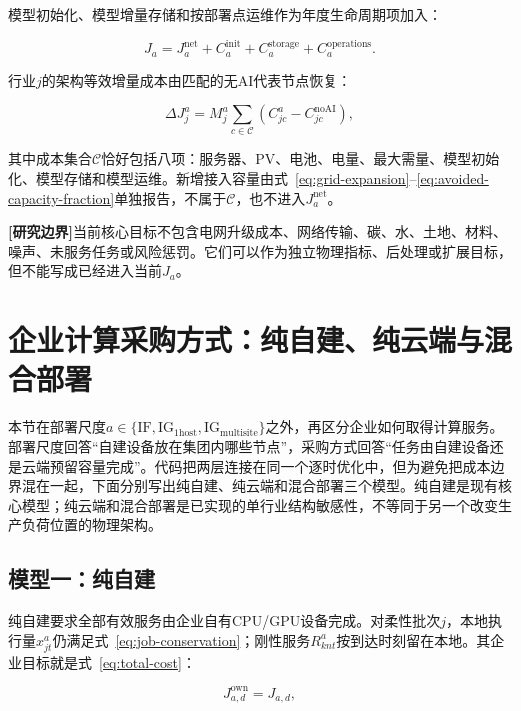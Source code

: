\documentclass[preprint]{elsarticle}
\newcommand{\boundary}{\textcolor{black!65}{\textbf{[研究边界]}}}
\begin{document}
模型初始化、模型增量存储和按部署点运维作为年度生命周期项加入：

\begin{equation}
 J_a=J_a^{\mathrm{net}}+C_a^{\mathrm{init}}
 +C_a^{\mathrm{storage}}+C_a^{\mathrm{operations}}.
 \label{eq:total-cost}
\end{equation}

行业$j$的架构等效增量成本由匹配的无AI代表节点恢复：

\begin{equation}
 \Delta J^a_j=M^a_j\sum_{c\in\mathcal C}
 (C^a_{jc}-C^{\mathrm{noAI}}_{jc}),
 \label{eq:incremental-cost}
\end{equation}

其中成本集合$\mathcal C$恰好包括八项：服务器、PV、电池、电量、最大需量、模型初始化、模型存储和模型运维。新增接入容量由式~\eqref{eq:grid-expansion}--\eqref{eq:avoided-capacity-fraction}单独报告，不属于$\mathcal C$，也不进入$J_a^{\mathrm{net}}$。

\boundary 当前核心目标不包含电网升级成本、网络传输、碳、水、土地、材料、噪声、未服务任务或风险惩罚。它们可以作为独立物理指标、后处理或扩展目标，但不能写成已经进入当前$J_a$。

\section{企业计算采购方式：纯自建、纯云端与混合部署}

本节在部署尺度$a\in\{\mathrm{IF},\mathrm{IG}_{1\mathrm{host}},\mathrm{IG}_{\mathrm{multisite}}\}$之外，再区分企业如何取得计算服务。部署尺度回答“自建设备放在集团内哪些节点”，采购方式回答“任务由自建设备还是云端预留容量完成”。代码把两层连接在同一个逐时优化中，但为避免把成本边界混在一起，下面分别写出纯自建、纯云端和混合部署三个模型。纯自建是现有核心模型；纯云端和混合部署是已实现的单行业结构敏感性，不等同于另一个改变生产负荷位置的物理架构。

\subsection{模型一：纯自建}

纯自建要求全部有效服务由企业自有CPU/GPU设备完成。对柔性批次$j$，本地执行量$x^a_{jt}$仍满足式~\eqref{eq:job-conservation}；刚性服务$R^a_{knt}$按到达时刻留在本地。其企业目标就是式~\eqref{eq:total-cost}：

\begin{equation}
 J^{\mathrm{own}}_{a,d}=J_{a,d},
 \label{eq:pure-owned-model}
\end{equation}
\end{document}
